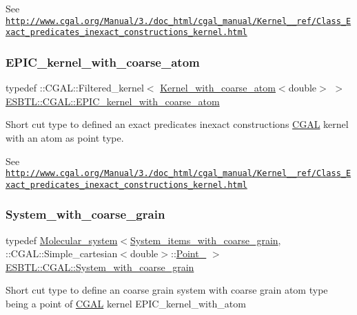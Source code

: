 See \href{http://www.cgal.org/Manual/3.5/doc_html/cgal_manual/Kernel_23_ref/Class_Exact_predicates_inexact_constructions_kernel.html}{\tt http\+://www.\+cgal.\+org/\+Manual/3./doc\+\_\+html/cgal\+\_\+manual/\+Kernel\+\_\+\_\+ref/\+Class\+\_\+\+Exact\+\_\+predicates\+\_\+inexact\+\_\+constructions\+\_\+kernel.\+html} \mbox{\label{namespaceESBTL_1_1CGAL_a3e9468c7a5fd8e3d29abdfaa53ecd55d}} 
\subsubsection{\texorpdfstring{E\+P\+I\+C\+\_\+kernel\+\_\+with\+\_\+coarse\+\_\+atom}{EPIC\_kernel\_with\_coarse\_atom}}
{\footnotesize\ttfamily typedef \+::C\+G\+A\+L\+::\+Filtered\+\_\+kernel$<$ \hyperlink{structESBTL_1_1CGAL_1_1Kernel__with__coarse__atom}{Kernel\+\_\+with\+\_\+coarse\+\_\+atom}$<$double$>$ $>$ \hyperlink{namespaceESBTL_1_1CGAL_a3e9468c7a5fd8e3d29abdfaa53ecd55d}{E\+S\+B\+T\+L\+::\+C\+G\+A\+L\+::\+E\+P\+I\+C\+\_\+kernel\+\_\+with\+\_\+coarse\+\_\+atom}}

Short cut type to defined an exact predicates inexact constructions \hyperlink{namespaceESBTL_1_1CGAL}{C\+G\+AL} kernel with an atom as point type.

See \href{http://www.cgal.org/Manual/3.5/doc_html/cgal_manual/Kernel_23_ref/Class_Exact_predicates_inexact_constructions_kernel.html}{\tt http\+://www.\+cgal.\+org/\+Manual/3./doc\+\_\+html/cgal\+\_\+manual/\+Kernel\+\_\+\_\+ref/\+Class\+\_\+\+Exact\+\_\+predicates\+\_\+inexact\+\_\+constructions\+\_\+kernel.\+html} \mbox{\label{namespaceESBTL_1_1CGAL_a3c029e52b1d0fd721493a259336696db}} 
\subsubsection{\texorpdfstring{System\+\_\+with\+\_\+coarse\+\_\+grain}{System\_with\_coarse\_grain}}
{\footnotesize\ttfamily typedef \hyperlink{classESBTL_1_1Molecular__system}{Molecular\+\_\+system}$<$\hyperlink{structESBTL_1_1System__items__with__coarse__grain}{System\+\_\+items\+\_\+with\+\_\+coarse\+\_\+grain}, \+::C\+G\+A\+L\+::\+Simple\+\_\+cartesian$<$double$>$\+::\hyperlink{classESBTL_1_1Point__3}{Point\+\_} $>$ \hyperlink{namespaceESBTL_1_1CGAL_a3c029e52b1d0fd721493a259336696db}{E\+S\+B\+T\+L\+::\+C\+G\+A\+L\+::\+System\+\_\+with\+\_\+coarse\+\_\+grain}}

Short cut type to define an coarse grain system with coarse grain atom type being a point of \hyperlink{namespaceESBTL_1_1CGAL}{C\+G\+AL} kernel E\+P\+I\+C\+\_\+kernel\+\_\+with\+\_\+atom 